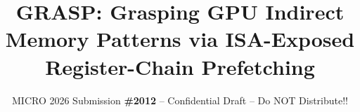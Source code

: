 \documentclass[sigconf, screen, review]{acmart}
\begin{document}
\title{GRASP: Grasping GPU Indirect Memory Patterns via ISA-Exposed Register-Chain Prefetching}
\subtitle{\normalsize{MICRO 2026 Submission
    \textbf{\#2012} -- Confidential Draft -- Do NOT Distribute!!}}



\end{document}

